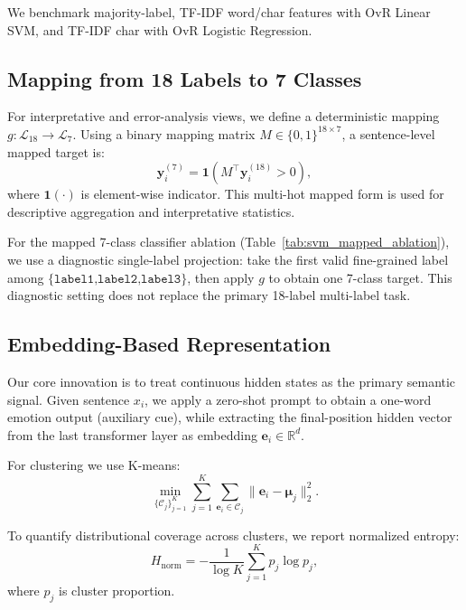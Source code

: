 \documentclass[11pt]{article}
\begin{document}
We benchmark majority-label, TF-IDF word/char features with OvR Linear SVM, and TF-IDF char with OvR Logistic Regression.

\subsection{Mapping from 18 Labels to 7 Classes}

For interpretative and error-analysis views, we define a deterministic mapping
\(g:\mathcal{L}_{18}\rightarrow\mathcal{L}_{7}\).
Using a binary mapping matrix \(M\in\{0,1\}^{18\times 7}\), a sentence-level mapped target is:
\begin{equation}
\mathbf{y}^{(7)}_i = \mathbf{1}\left(M^\top\mathbf{y}^{(18)}_i > 0\right),
\label{eq:map}
\end{equation}
where \(\mathbf{1}(\cdot)\) is element-wise indicator.
This multi-hot mapped form is used for descriptive aggregation and interpretative statistics.

For the mapped 7-class classifier ablation (Table~\ref{tab:svm_mapped_ablation}), we use a diagnostic single-label projection:
take the first valid fine-grained label among \(\{\texttt{label1,label2,label3}\}\), then apply \(g\) to obtain one 7-class target.
This diagnostic setting does not replace the primary 18-label multi-label task.

\subsection{Embedding-Based Representation}

Our core innovation is to treat continuous hidden states as the primary semantic signal.
Given sentence \(x_i\), we apply a zero-shot prompt to obtain a one-word emotion output (auxiliary cue), while extracting the final-position hidden vector from the last transformer layer as embedding \(\mathbf{e}_i\in\mathbb{R}^d\).

For clustering we use K-means:
\begin{equation}
\min_{\{\mathcal{C}_j\}_{j=1}^{K}} \sum_{j=1}^{K} \sum_{\mathbf{e}_i\in\mathcal{C}_j}
\lVert \mathbf{e}_i-\boldsymbol{\mu}_j \rVert_2^2.
\label{eq:kmeans}
\end{equation}

To quantify distributional coverage across clusters, we report normalized entropy:
\begin{equation}
H_{\text{norm}} = -\frac{1}{\log K}\sum_{j=1}^{K} p_j\log p_j,
\label{eq:entropy}
\end{equation}
where \(p_j\) is cluster proportion.
\end{document}
